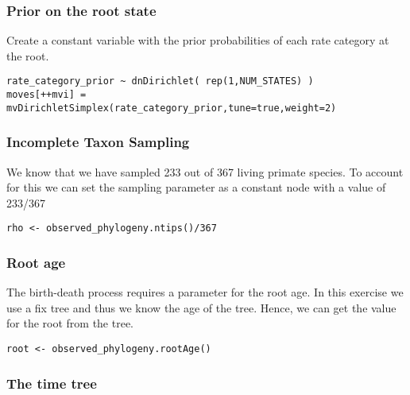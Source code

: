 \subsubsection{Prior on the root state}
Create a constant variable with the prior probabilities of each rate category at the root.
{\tt \begin{snugshade*}
\begin{lstlisting}
rate_category_prior ~ dnDirichlet( rep(1,NUM_STATES) )
moves[++mvi] = mvDirichletSimplex(rate_category_prior,tune=true,weight=2)
\end{lstlisting}
\end{snugshade*}}

\subsubsection{Incomplete Taxon Sampling}

We know that we have sampled 233 out of 367 living primate species. 
To account for this we can set the sampling parameter as a constant node with a value of 233/367
{\tt \begin{snugshade*}
\begin{lstlisting}
rho <- observed_phylogeny.ntips()/367
\end{lstlisting}
\end{snugshade*}}


\subsubsection{Root age}

The birth-death process requires a parameter for the root age.
In this exercise we use a fix tree and thus we know the age of the tree.
Hence, we can get the value for the root from the \citet{MagnusonFord2012} tree.
{\tt \begin{snugshade*}
\begin{lstlisting}
root <- observed_phylogeny.rootAge()
\end{lstlisting}
\end{snugshade*}}

\subsubsection{The time tree}


